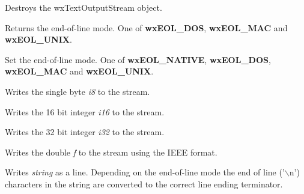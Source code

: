 
Destroys the wxTextOutputStream object.



Returns the end-of-line mode. One of {\bf wxEOL\_DOS}, {\bf wxEOL\_MAC} and {\bf wxEOL\_UNIX}.



Set the end-of-line mode. One of {\bf wxEOL\_NATIVE}, {\bf wxEOL\_DOS}, {\bf wxEOL\_MAC} and {\bf wxEOL\_UNIX}.



Writes the single byte {\it i8} to the stream.



Writes the 16 bit integer {\it i16} to the stream.



Writes the 32 bit integer {\it i32} to the stream.



Writes the double {\it f} to the stream using the IEEE format.



Writes {\it string} as a line. Depending on the end-of-line mode the end of
line ('$\backslash$n') characters in the string are converted to the correct
line ending terminator.

